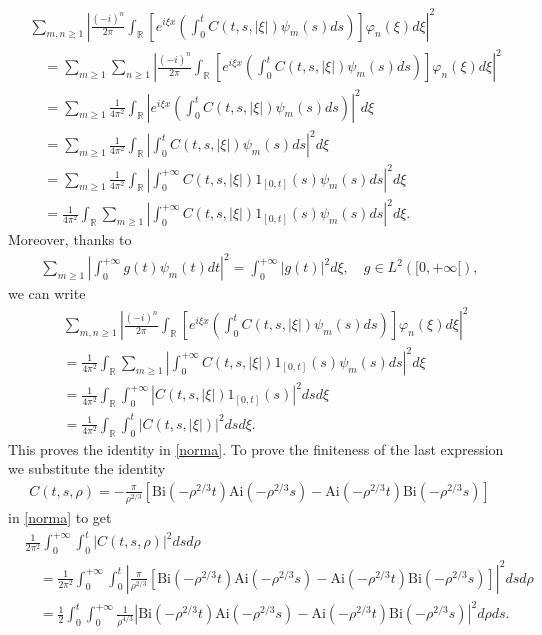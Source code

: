 \documentclass{article}
\begin{document}
\begin{align*}
&\sum_{m,n\geq 1}\left|\frac{(-i)^n}{2\pi}\int_{\mathbb{R}}\left[e^{i\xi x}\left(\int_0^tC(t,s,|\xi|)\psi_m(s)ds\right)\right]\varphi_n(\xi)d\xi\right|^2\\
&\quad=\sum_{m\geq 1}\sum_{n\geq 1}\left|\frac{(-i)^n}{2\pi}\int_{\mathbb{R}}\left[e^{i\xi x}\left(\int_0^tC(t,s,|\xi|)\psi_m(s)ds\right)\right]\varphi_n(\xi)d\xi\right|^2\\
&\quad=\sum_{m\geq 1}\frac{1}{4\pi^2}\int_{\mathbb{R}}\left|e^{i\xi x}\left(\int_0^tC(t,s,|\xi|)\psi_m(s)ds\right)\right|^2d\xi\\
&\quad=\sum_{m\geq 1}\frac{1}{4\pi^2}\int_{\mathbb{R}}\left|\int_0^tC(t,s,|\xi|)\psi_m(s)ds\right|^2d\xi\\
&\quad=\sum_{m\geq 1}\frac{1}{4\pi^2}\int_{\mathbb{R}}\left|\int_0^{+\infty}C(t,s,|\xi|)1_{[0,t]}(s)\psi_m(s)ds\right|^2d\xi\\
&\quad=\frac{1}{4\pi^2}\int_{\mathbb{R}}\sum_{m\geq 1}\left|\int_0^{+\infty}C(t,s,|\xi|)1_{[0,t]}(s)\psi_m(s)ds\right|^2d\xi.
\end{align*}
Moreover, thanks to 
\begin{align*}
\sum_{m\geq 1}\left|\int_0^{+\infty}g(t)\psi_m(t)dt\right|^2=\int_0^{+\infty}|g(t)|^2d\xi,\quad g\in L^2([0,+\infty[),
\end{align*}
we can write
\begin{align*}
&\sum_{m,n\geq 1}\left|\frac{(-i)^n}{2\pi}\int_{\mathbb{R}}\left[e^{i\xi x}\left(\int_0^tC(t,s,|\xi|)\psi_m(s)ds\right)\right]\varphi_n(\xi)d\xi\right|^2\\
&=\frac{1}{4\pi^2}\int_{\mathbb{R}}\sum_{m\geq 1}\left|\int_0^{+\infty}C(t,s,|\xi|)1_{[0,t]}(s)\psi_m(s)ds\right|^2d\xi\\
&=\frac{1}{4\pi^2}\int_{\mathbb{R}}\int_0^{+\infty}\left|C(t,s,|\xi|)1_{[0,t]}(s)\right|^2dsd\xi\\
&=\frac{1}{4\pi^2}\int_{\mathbb{R}}\int_0^{t}\left|C(t,s,|\xi|)\right|^2ds d\xi.
\end{align*}
This proves the identity in \eqref{norma}. To prove the finiteness of the last expression
we substitute the identity
\begin{align*}
C(t,s,\rho)=-\frac{\pi}{\rho^{2/3}}\left[\mathrm{Bi}(-\rho^{2/3}t)\mathrm{Ai}(-\rho^{2/3}s)-\mathrm{Ai}(-\rho^{2/3}t)\mathrm{Bi}(-\rho^{2/3}s)\right]
\end{align*}
in \eqref{norma} to get
\begin{align}\label{z}
&\frac{1}{2\pi^2}\int_0^{+\infty}\int_0^{t}\left|C(t,s,\rho)\right|^2ds d\rho\nonumber\\
&\quad=\frac{1}{2\pi^2}\int_0^{+\infty}\int_0^{t}\left|\frac{\pi}{\rho^{2/3}}\left[\mathrm{Bi}(-\rho^{2/3}t)\mathrm{Ai}(-\rho^{2/3}s)-\mathrm{Ai}(-\rho^{2/3}t)\mathrm{Bi}(-\rho^{2/3}s)\right]\right|^2ds d\rho\nonumber\\
&\quad=\frac{1}{2}\int_0^{t}\int_0^{+\infty}\frac{1}{\rho^{4/3}}\left|\mathrm{Bi}(-\rho^{2/3}t)\mathrm{Ai}(-\rho^{2/3}s)-\mathrm{Ai}(-\rho^{2/3}t)\mathrm{Bi}(-\rho^{2/3}s)\right|^2 d\rho ds.
\end{align}
\end{document}

